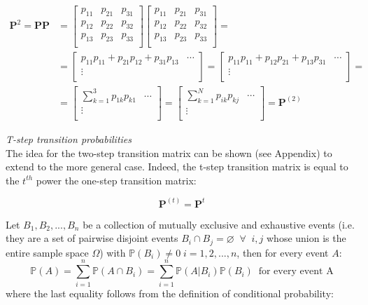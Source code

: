 \documentclass[\main/main.tex]{subfiles}
\begin{document}
\begin{equation}
\begin{split}
  \mathbf{P}^2 = \mathbf{P} \mathbf{P} &= 
\begin{bmatrix}
p_{11} & p_{21} & p_{31} \\
p_{12} & p_{22} & p_{32}  \\
p_{13} & p_{23} & p_{33}  \\
\end{bmatrix}
\begin{bmatrix}
p_{11} & p_{21} & p_{31} \\
p_{12} & p_{22} & p_{32}  \\
p_{13} & p_{23} & p_{33}  \\
\end{bmatrix}=\\
&= 
\begin{bmatrix}
p_{11}p_{11} + p_{21}p_{12} + p_{31}p_{13} & \cdots \\
\vdots\\
\end{bmatrix} =
\begin{bmatrix}
p_{11}p_{11} + p_{12}p_{21} + p_{13}p_{31} & \cdots \\
\vdots\\
\end{bmatrix} =\\
&= 
\begin{bmatrix}
\sum_{k=1}^3 p_{1k}p_{k1} & \cdots\\
\vdots\\
\end{bmatrix} = 
\begin{bmatrix}
\sum_{k=1}^N p_{ik}p_{kj} & \cdots\\
\vdots\\
\end{bmatrix} = 
\mathbf{P}^{(2)} 
\end{split}
\end{equation}

\noindent \textit{T-step transition probabilities}\\
The idea for the two-step transition matrix can be shown (see Appendix) to extend to the more general case. Indeed, the t-step transition matrix is equal to the  $t^{th}$ power the one-step transition matrix:

\begin{equation}
    \mathbf{P}^{(t)} = \mathbf{P}^t
\end{equation}

\noindent Let $B_1, B_2, ..., B_n$ be a collection of mutually exclusive and exhaustive events (i.e. they are a set of pairwise disjoint events $B_i \cap B_j = \varnothing \; \; \forall \; \; i, j$ whose union is the entire sample space $\Omega$) with $\mathds{P}(B_i) \neq 0 \; i=1,2,...,n$, then for every event  $A$:
\begin{equation}
     \mathds{P}(A) = \sum_{i=1}^{n} \mathds{P} (A \cap B_i) = \sum_{i=1}^{n} \mathds{P}(A | B_i) \mathds{P}(B_i) \; \; \text{for every event A}
\end{equation}
where the last equality follows from the definition of conditional probability:
\end{document}
